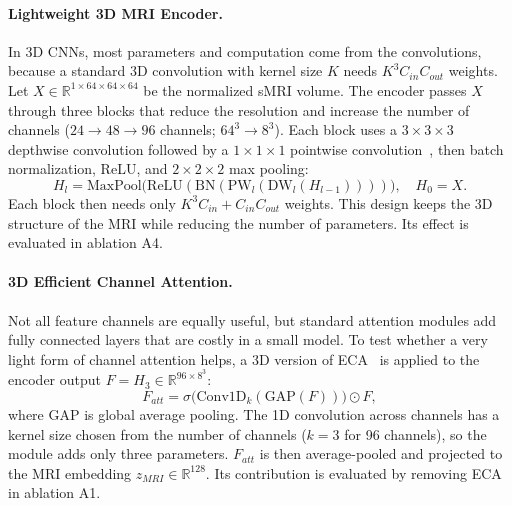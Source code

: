 \documentclass[runningheads]{llncs}
\begin{document}
\FloatBarrier

\paragraph{Lightweight 3D MRI Encoder.}
In 3D CNNs, most parameters and computation come from the convolutions, because a standard 3D convolution with kernel size $K$ needs $K^3C_{in}C_{out}$ weights. Let $X\in\mathbb{R}^{1\times64\times64\times64}$ be the normalized sMRI volume. The encoder passes $X$ through three blocks that reduce the resolution and increase the number of channels ($24\rightarrow48\rightarrow96$ channels; $64^3\rightarrow8^3$). Each block uses a $3\times3\times3$ depthwise convolution followed by a $1\times1\times1$ pointwise convolution~\cite{chollet2017xception,howard2017mobilenets}, then batch normalization, ReLU, and $2\times2\times2$ max pooling:
\begin{equation}
H_{l} = \mathrm{MaxPool}\big(\mathrm{ReLU}(\mathrm{BN}(\mathrm{PW}_l(\mathrm{DW}_l(H_{l-1}))))\big), \quad H_0 = X.
\end{equation}
Each block then needs only $K^3C_{in}+C_{in}C_{out}$ weights. This design keeps the 3D structure of the MRI while reducing the number of parameters. Its effect is evaluated in ablation A4.

\paragraph{3D Efficient Channel Attention.}
Not all feature channels are equally useful, but standard attention modules add fully connected layers that are costly in a small model. To test whether a very light form of channel attention helps, a 3D version of ECA~\cite{wang2020eca} is applied to the encoder output $F=H_3\in\mathbb{R}^{96\times8^3}$:
\begin{equation}
F_{att} = \sigma\big(\mathrm{Conv1D}_k(\mathrm{GAP}(F))\big)\odot F,
\end{equation}
where GAP is global average pooling. The 1D convolution across channels has a kernel size chosen from the number of channels ($k=3$ for 96 channels), so the module adds only three parameters. $F_{att}$ is then average-pooled and projected to the MRI embedding $z_{MRI}\in\mathbb{R}^{128}$. Its contribution is evaluated by removing ECA in ablation A1.
\end{document}
